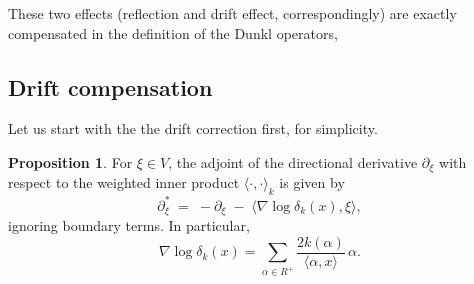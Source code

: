 \documentclass[12pt]{article}
\newcommand{\1}{\mathbbm{1}}
\theoremstyle{definition}
\newtheorem{proposition}{Proposition}
\begin{document}
\noindent
These two effects (reflection and drift effect, correspondingly) are exactly compensated in the definition of the Dunkl operators,
 
\subsection{Drift compensation}
Let us start with the the drift correction first, for simplicity.
\begin{proposition}\label{prop1}
For $\xi \in V$, the adjoint of the directional derivative
$\partial_\xi$ with respect to the weighted inner product
$\langle \cdot , \cdot \rangle_k$ is given by
\[
  \partial_\xi^{*} \;=\; -\partial_\xi \;-\; \langle \nabla \log \delta_k(x), \xi \rangle ,
\]
ignoring boundary terms. In particular,
\[
  \nabla \log \delta_k(x) = \sum_{\alpha \in R^+} 
  \frac{2k(\alpha)}{\langle \alpha, x\rangle}\,\alpha .
\]

\end{proposition}
\end{document}
